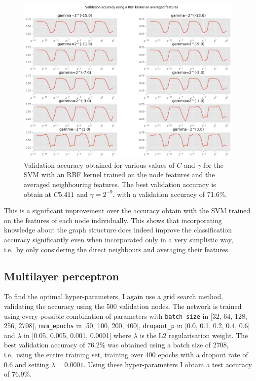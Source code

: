 \documentclass[12pt]{article}
\theoremstyle{definition}
\begin{document}
\begin{figure}[h]
	\includegraphics[width=1.0\textwidth]{average_svm/rbf_reg}
	\centering
	\caption{Validation accuracy obtained for various values of $C$ and $\gamma$ for the SVM with an RBF kernel trained on the node features and the averaged neighbouring features. The best validation accuracy is obtain at $C5.411$ and $\gamma=2^{-9}$, with a validation accuracy of 71.6\%.}
	\label{fig/average_svm_rbf_reg}
\end{figure}

This is a significant improvement over the accuracy obtain with the SVM trained on the features of each node individually. This shows that incorporating knowledge about the graph structure does indeed improve the classification accuracy significantly even when incorporated only in a very simplistic way, i.e.\ by only considering the direct neighbours and averaging their features.

\subsection{Multilayer perceptron}
To find the optimal hyper-parameters, I again use a grid search method, validating the accuracy using the 500 validation nodes. The network is trained using every possible combination of parameters with \texttt{batch\_size} in [32, 64, 128, 256, 2708], \texttt{num\_epochs} in  [50, 100, 200, 400], \texttt{dropout\_p} in  [0.0, 0.1, 0.2, 0.4, 0.6] and $\lambda$ in  [0.05, 0.005, 0.001, 0.0001] where $\lambda$ is the L2 regularisation weight. The best validation accuracy of 76.2\% was obtained using a batch size of 2708, i.e.\ using the entire training set, training over 400 epochs with a dropout rate of 0.6 and setting $\lambda = 0.0001$. Using these hyper-parameters I obtain a test accuracy of 76.9\%.
\end{document}
